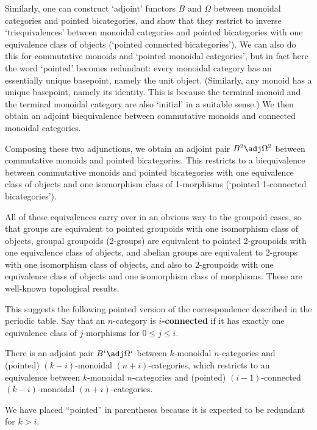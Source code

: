 \documentclass{amsart}
\begin{document}
Similarly, one can construct `adjoint' functors $B$ and $\Omega$
between monoidal categories and pointed bicategories, and show that
they restrict to inverse `triequivalences' between monoidal categories
and pointed bicategories with one equivalence class of objects
(`pointed connected bicategories').  We can also do this for
commutative monoids and `pointed monoidal categories', but in fact
here the word `pointed' becomes redundant: every monoidal category has
an essentially unique basepoint, namely the unit object.  (Similarly,
any monoid has a unique basepoint, namely its identity.  This is
because the terminal monoid and the terminal monoidal category are
also `initial' in a suitable sense.)  We then obtain an adjoint
biequivalence between commutative monoids and connected monoidal
categories.

Composing these two adjunctions, we obtain an adjoint pair $B^2\adj
\Omega^2$ between commutative monoids and pointed bicategories.  This
restricts to a biequivalence between commutative monoids and pointed
bicategories with one equivalence class of objects and one isomorphism
class of 1-morphisms (`pointed 1-connected bicategories').

All of these equivalences carry over in an obvious way to the groupoid
cases, so that groups are equivalent to pointed groupoids with one
isomorphism class of objects, groupal groupoids (2-groups) are
equivalent to pointed 2-groupoids with one equivalence class of
objects, and abelian groups are equivalent to 2-groups with one
isomorphism class of objects, and also to 2-groupoids with one
equivalence class of objects and one isomorphism class of morphisms.
These are well-known topological results.

This suggests the following pointed version of the correspondence
described in the periodic table.  Say that an $n$-category is
\textbf{$i$-connected} if it has exactly one equivalence class of
$j$-morphisms for $0\le j \le i$.

\begin{hyp} \label{hyp:delooping}
  There is an adjoint pair $B^i\adj \Omega^i$ between $k$-monoidal
  $n$-categories and (pointed) $(k-i)$-monoidal $(n+i)$-categories,
  which restricts to an equivalence between $k$-monoidal
  $n$-categories and (pointed) $(i-1)$-connected $(k-i)$-monoidal
  $(n+i)$-categories.
\end{hyp}
\noindent
We have placed ``pointed'' in parentheses because it is 
expected to be redundant for $k>i$.
\end{document}

